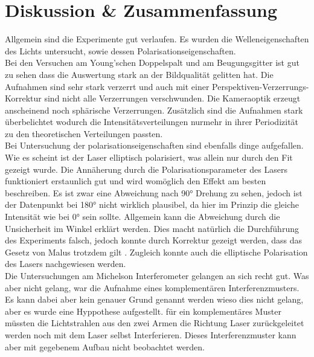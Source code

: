 \section{Diskussion \& Zusammenfassung}
\label{sec:diskussion}
Allgemein sind die Experimente gut verlaufen.
Es wurden die Welleneigenschaften des Lichts untersucht, sowie dessen Polarisationseigenschaften.\\

Bei den Versuchen am Young'schen Doppelspalt und am Beugungsgitter ist gut zu sehen dass die Auswertung stark an der Bildqualität gelitten hat.
Die Aufnahmen sind sehr stark verzerrt und auch mit einer Perspektiven-Verzerrungs-Korrektur sind nicht alle Verzerrungen verschwunden.
Die Kameraoptik erzeugt anscheinend noch sphärische Verzerrungen.
Zusätzlich sind die Aufnahmen stark überbelichtet wodurch die Intensitätsverteilungen nurmehr in ihrer Periodizität zu den theoretischen Verteilungen passten.\\

Bei Untersuchung der polarisationseigenschaften sind ebenfalls dinge aufgefallen.
Wie es scheint ist der Laser elliptisch polarisiert, was allein nur durch den Fit gezeigt wurde.
Die Annäherung durch die Polarisationsparameter des Lasers funktioniert erstaunlich gut und wird womöglich den Effekt am besten beschreiben.
Es ist zwar eine Abweichung nach 90° Drehung zu sehen, jedoch ist der Datenpunkt bei 180° nicht wirklich plausibel, da hier im Prinzip die gleiche Intensität wie bei 0° sein sollte.
Allgemein kann die Abweichung durch die Unsicherheit im Winkel erklärt werden.
Dies macht natürlich die Durchführung des Experiments falsch, jedoch konnte durch Korrektur gezeigt werden, dass das Gesetz von Malus trotzdem gilt .
Zugleich konnte auch die elliptische Polarisation des Lasers nachgewiesen werden.\\

Die Untersuchungen am Michelson Interferometer gelangen an sich recht gut.
Was aber nicht gelang, war die Aufnahme eines komplementären Interferenzmusters.
Es kann dabei aber kein genauer Grund genannt werden wieso dies nicht gelang, aber es wurde eine Hyppothese aufgestellt.
für ein komplementäres Muster müssten die Lichtstrahlen aus den zwei Armen die Richtung Laser zurückgeleitet werden noch mit dem Laser selbst Interferieren.
Dieses Interferenzmuster kann aber mit gegebenem Aufbau nicht beobachtet werden.